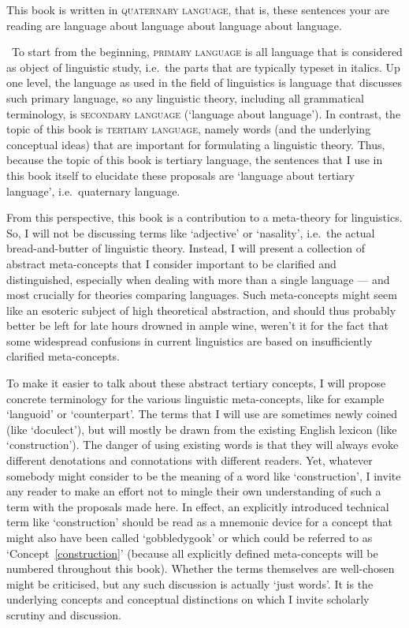 This book is written in \textsc{quaternary language}, that is, these sentences your are reading are language about language about language about language.



\ \newline To start from the beginning, \textsc{primary language} is all language that is considered as object of linguistic study, i.e.~the parts that are typically typeset in italics. Up one level, the language as used in the field of linguistics is language that discusses such primary language, so any linguistic theory, including all grammatical terminology, is \textsc{secondary language} (`language about language'). In contrast, the topic of this book is \textsc{tertiary language}, namely words (and the underlying conceptual ideas) that are important for formulating a linguistic theory. Thus, because the topic of this book is tertiary language, the sentences that I use in this book itself to elucidate these proposals are `language about tertiary language', i.e.~quaternary language.

From this perspective, this book is a contribution to a meta-theory for linguistics. So, I will not be discussing terms like `adjective' or `nasality', i.e.~the actual bread-and-butter of linguistic theory. Instead, I will present a collection of abstract meta-concepts that I consider important to be clarified and distinguished, especially when dealing with more than a single language --- and most crucially for theories comparing languages. Such meta-concepts might seem like an esoteric subject of high theoretical abstraction, and should thus probably better be left for late hours drowned in ample wine, weren't it for the fact that some widespread confusions in current linguistics are based on insufficiently clarified meta-concepts.

To make it easier to talk about these abstract tertiary concepts, I will propose concrete terminology for the various linguistic meta-concepts, like for example `languoid' or `counterpart'. The terms that I will use are sometimes newly coined (like `doculect'), but will mostly be drawn from the existing English lexicon (like `construction'). The danger of using existing words is that they will always evoke different denotations and connotations with different readers. Yet, whatever somebody might consider to be the meaning of a word like `construction', I invite any reader to make an effort not to mingle their own understanding of such a term with the proposals made here. In effect, an explicitly introduced technical term like `construction' should be read as a mnemonic device for a concept that might also have been called `gobbledygook' or which could be referred to as `Concept~\ref{construction}' (because all explicitly defined meta-concepts will be numbered throughout this book). Whether the terms themselves are well-chosen might be criticised, but any such discussion is actually `just words'. It is the underlying concepts and conceptual distinctions on which I invite scholarly scrutiny and discussion.

